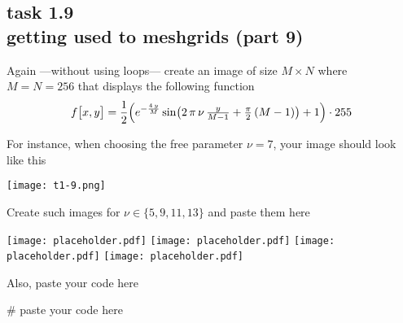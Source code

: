 
\subsection*{task 1.9 \\[1ex] getting used to meshgrids (part 9)}

Again ---without using  loops--- create an image of size $M \times N$ where $M = N = 256$ that displays the following function
\begin{equation*}
f \bigl[ x, y \bigr] = \frac{1}{2} \Bigl( e^{-\frac{4\,y}{M}}\sin \bigl( 2\,\pi\,\nu \, \tfrac{y}{M-1} + \tfrac{\pi}{2} \, (M-1)\bigr) + 1 \Bigr) \cdot 255
\end{equation*}

For instance, when choosing the free parameter $\nu = 7$, your image should look like this
\begin{center}
\texttt{[image: t1-9.png]} 
\end{center}

\vspace{1cm}
Create such images for $\nu \in \{ 5, 9, 11, 13 \}$ and paste them here
\begin{center}
\texttt{[image: placeholder.pdf]} \hfill
\texttt{[image: placeholder.pdf]} \hfill
\texttt{[image: placeholder.pdf]} \hfill
\texttt{[image: placeholder.pdf]} 
\end{center}



\newpage
Also, paste your code here \\[1ex]
\begin{python}
# paste your code here

\end{python}






